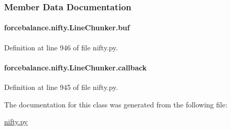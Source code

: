 \subsubsection{Member Data Documentation}
\hypertarget{classforcebalance_1_1nifty_1_1LineChunker_aad441300bffd286519b62c0f871f3867}{
\paragraph[{buf}]{\setlength{\rightskip}{0pt plus 5cm}forcebalance.\-nifty.\-Line\-Chunker.\-buf}}\label{classforcebalance_1_1nifty_1_1LineChunker_aad441300bffd286519b62c0f871f3867}


Definition at line 946 of file nifty.\-py.

\hypertarget{classforcebalance_1_1nifty_1_1LineChunker_aadc78efc999ffbb1decfeb593d8a3b69}{
\paragraph[{callback}]{\setlength{\rightskip}{0pt plus 5cm}forcebalance.\-nifty.\-Line\-Chunker.\-callback}}\label{classforcebalance_1_1nifty_1_1LineChunker_aadc78efc999ffbb1decfeb593d8a3b69}


Definition at line 945 of file nifty.\-py.



The documentation for this class was generated from the following file\-:\begin{DoxyCompactItemize}
\item 
\hyperlink{nifty_8py}{nifty.\-py}\end{DoxyCompactItemize}
